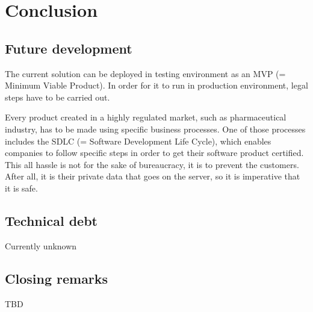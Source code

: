 \chapter{Conclusion}

\section{Future development}

The current solution can be deployed in testing environment as an MVP (= Minimum Viable Product). In order for it to run in production environment, legal steps have to be carried out.

Every product created in a highly regulated market, such as pharmaceutical industry, has to be made using specific business processes. One of those processes includes the SDLC (= Software Development Life Cycle), which enables companies to follow specific steps in order to get their software product certified. This all hassle is not for the sake of bureaucracy, it is to prevent the customers. After all, it is their private data that goes on the server, so it is imperative that it is safe.

\section{Technical debt}
Currently unknown

\section{Closing remarks}
TBD